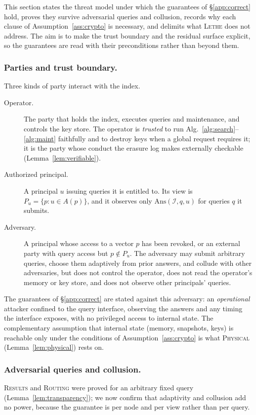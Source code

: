 \documentclass[sigconf, nonacm, review]{acmart}
\begin{document}
This section states the threat model under which the guarantees of
\S\ref{app:correct} hold, proves they survive adversarial queries and
collusion, records why each clause of Assumption~\ref{ass:crypto} is necessary,
and delimits what \textsc{Lethe} does not address. The aim is to make the trust
boundary and the residual surface explicit, so the guarantees are read with
their preconditions rather than beyond them.

\subsubsection{Parties and trust boundary.}
\label{app:scope-model}
Three kinds of party interact with the index.

\begin{description}
\item[Operator.] The party that holds the index, executes queries and
maintenance, and controls the key store. The operator is \emph{trusted} to run
Alg.~\ref{alg:search}--\ref{alg:maint} faithfully and to destroy keys when a
global request requires it; it is the party whose conduct the erasure log makes
externally checkable (Lemma~\ref{lem:verifiable}).
\item[Authorized principal.] A principal $u$ issuing queries it is entitled
to. Its view is $P_u=\{p:u\in A(p)\}$, and it observes only
$\mathrm{Ans}(\mathcal{I},q,u)$ for queries $q$ it submits.
\item[Adversary.] A principal whose access to a vector $p$ has been revoked,
or an external party with query access but $p\notin P_u$. The adversary may
submit arbitrary queries, choose them adaptively from prior answers, and
collude with other adversaries, but does not control the operator, does not
read the operator's memory or key store, and does not observe other
principals' queries.
\end{description}

The guarantees of \S\ref{app:correct} are stated against this adversary: an
\emph{operational} attacker confined to the query interface, observing the
answers and any timing the interface exposes, with no privileged access to
internal state. The complementary assumption that internal state (memory,
snapshots, keys) is reachable only under the conditions of
Assumption~\ref{ass:crypto} is what \textsc{Physical}
(Lemma~\ref{lem:physical}) rests on.

\subsubsection{Adversarial queries and collusion.}
\label{app:scope-adv}
\textsc{Results} and \textsc{Routing} were proved for an arbitrary fixed query
(Lemma~\ref{lem:transparency}); we now confirm that adaptivity and collusion
add no power, because the guarantee is per node and per view rather than per
query.
\end{document}
